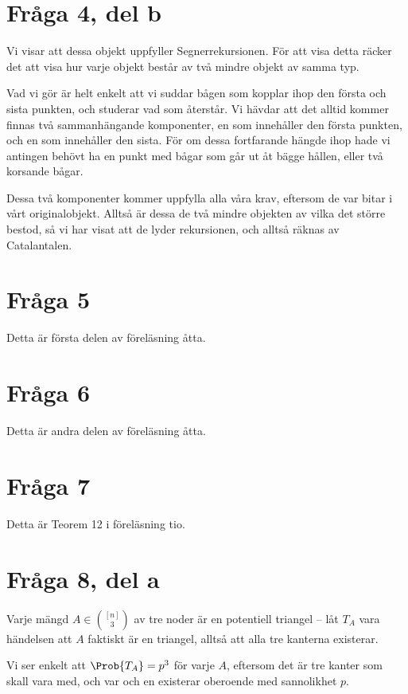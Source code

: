 \documentclass[nobib]{tufte-handout}
\begin{document}
\section{Fråga 4, del b}

Vi visar att dessa objekt uppfyller Segnerrekursionen. För att visa detta räcker det att visa hur varje objekt består av två mindre objekt av samma typ.

Vad vi gör är helt enkelt att vi suddar bågen som kopplar ihop den första och sista punkten, och studerar vad som återstår. Vi hävdar att det alltid kommer finnas två sammanhängande komponenter, en som innehåller den första punkten, och en som innehåller den sista. För om dessa fortfarande hängde ihop hade vi antingen behövt ha en punkt med bågar som går ut åt bägge hållen, eller två korsande bågar.

Dessa två komponenter kommer uppfylla alla våra krav, eftersom de var bitar i vårt originalobjekt. Alltså är dessa de två mindre objekten av vilka det större bestod, så vi har visat att de lyder rekursionen, och alltså räknas av Catalantalen.

\section{Fråga 5}

Detta är första delen av föreläsning åtta.

\section{Fråga 6}

Detta är andra delen av föreläsning åtta.

\section{Fråga 7}

Detta är Teorem 12 i föreläsning tio.

\section{Fråga 8, del a}

Varje mängd $A \in \binom{[n]}{3}$ av tre noder är en potentiell triangel -- låt $T_A$ vara händelsen att $A$ faktiskt är en triangel, alltså att alla tre kanterna existerar.

Vi ser enkelt att $\Prob{T_A} = p^3$ för varje $A$, eftersom det är tre kanter som skall vara med, och var och en existerar oberoende med sannolikhet $p$.
\end{document}

